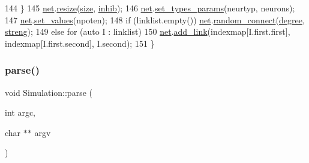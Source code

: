 \begin{DoxyCode}
144     \}
145     \hyperlink{classSimulation_a980a224fe68945549f217067ffc74f7c}{net}.\hyperlink{classNetwork_ad91ae24f308dd2b46ff76396fcdb9765}{resize}(\hyperlink{classSimulation_ae198f9ac020ed6bc6ebbd608ab3f959d}{size}, \hyperlink{classSimulation_a14c04fb020df35f875b1f5b2aab7a562}{inhib});
146     \hyperlink{classSimulation_a980a224fe68945549f217067ffc74f7c}{net}.\hyperlink{classNetwork_a40daf6578a6146f4c339f0efffd5070d}{set\_types\_params}(neurtyp, neurons);
147     \hyperlink{classSimulation_a980a224fe68945549f217067ffc74f7c}{net}.\hyperlink{classNetwork_a699416a6462f2da6a5f6cddb30f31440}{set\_values}(npoten);
148     \textcolor{keywordflow}{if} (linklist.empty()) \hyperlink{classSimulation_a980a224fe68945549f217067ffc74f7c}{net}.\hyperlink{classNetwork_a681d8f731ce258376a20f9bf062b943b}{random\_connect}(\hyperlink{classSimulation_ad0197878662d63d3ad1699aa7ffe01b2}{degree}, 
      \hyperlink{classSimulation_adfda098679d8fcb864ecd87409087d02}{streng});
149     \textcolor{keywordflow}{else} \textcolor{keywordflow}{for} (\textcolor{keyword}{auto} I : linklist) 
150              \hyperlink{classSimulation_a980a224fe68945549f217067ffc74f7c}{net}.\hyperlink{classNetwork_a6ebe0899329973e4924997a25e205856}{add\_link}(indexmap[I.first.first], indexmap[I.first.second], I.second);
151 \}
\end{DoxyCode}
\mbox{\label{classSimulation_a8f71691f59f56fcb86fa49281c2841db}} 
\subsubsection{\texorpdfstring{parse()}{parse()}}
{\footnotesize\ttfamily void Simulation\+::parse (\begin{DoxyParamCaption}\item[{int}]{argc,  }\item[{char $\ast$$\ast$}]{argv }\end{DoxyParamCaption})\hspace{0.3cm}{\ttfamily [private]}}

